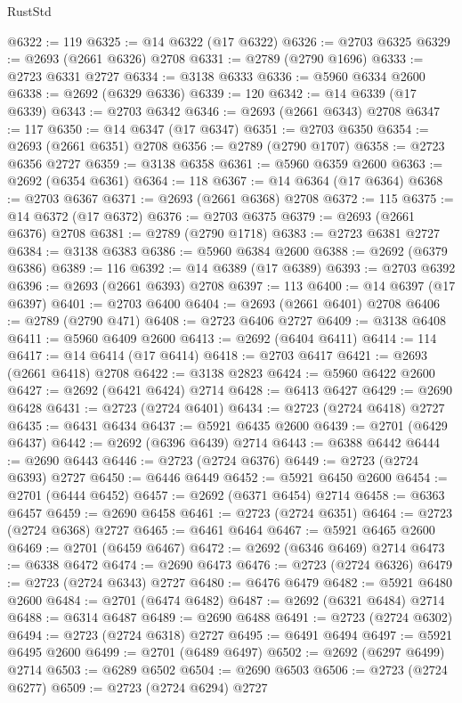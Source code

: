 \begin{lexlean}{RustStd}
\begin{coremodule}
@6322 := 119
@6325 := @14 @6322 (@17 @6322)
@6326 := @2703 @6325
@6329 := @2693 (@2661 @6326) @2708
@6331 := @2789 (@2790 @1696)
@6333 := @2723 @6331 @2727
@6334 := @3138 @6333
@6336 := @5960 @6334 @2600
@6338 := @2692 (@6329 @6336)
@6339 := 120
@6342 := @14 @6339 (@17 @6339)
@6343 := @2703 @6342
@6346 := @2693 (@2661 @6343) @2708
@6347 := 117
@6350 := @14 @6347 (@17 @6347)
@6351 := @2703 @6350
@6354 := @2693 (@2661 @6351) @2708
@6356 := @2789 (@2790 @1707)
@6358 := @2723 @6356 @2727
@6359 := @3138 @6358
@6361 := @5960 @6359 @2600
@6363 := @2692 (@6354 @6361)
@6364 := 118
@6367 := @14 @6364 (@17 @6364)
@6368 := @2703 @6367
@6371 := @2693 (@2661 @6368) @2708
@6372 := 115
@6375 := @14 @6372 (@17 @6372)
@6376 := @2703 @6375
@6379 := @2693 (@2661 @6376) @2708
@6381 := @2789 (@2790 @1718)
@6383 := @2723 @6381 @2727
@6384 := @3138 @6383
@6386 := @5960 @6384 @2600
@6388 := @2692 (@6379 @6386)
@6389 := 116
@6392 := @14 @6389 (@17 @6389)
@6393 := @2703 @6392
@6396 := @2693 (@2661 @6393) @2708
@6397 := 113
@6400 := @14 @6397 (@17 @6397)
@6401 := @2703 @6400
@6404 := @2693 (@2661 @6401) @2708
@6406 := @2789 (@2790 @471)
@6408 := @2723 @6406 @2727
@6409 := @3138 @6408
@6411 := @5960 @6409 @2600
@6413 := @2692 (@6404 @6411)
@6414 := 114
@6417 := @14 @6414 (@17 @6414)
@6418 := @2703 @6417
@6421 := @2693 (@2661 @6418) @2708
@6422 := @3138 @2823
@6424 := @5960 @6422 @2600
@6427 := @2692 (@6421 @6424) @2714
@6428 := @6413 @6427
@6429 := @2690 @6428
@6431 := @2723 (@2724 @6401)
@6434 := @2723 (@2724 @6418) @2727
@6435 := @6431 @6434
@6437 := @5921 @6435 @2600
@6439 := @2701 (@6429 @6437)
@6442 := @2692 (@6396 @6439) @2714
@6443 := @6388 @6442
@6444 := @2690 @6443
@6446 := @2723 (@2724 @6376)
@6449 := @2723 (@2724 @6393) @2727
@6450 := @6446 @6449
@6452 := @5921 @6450 @2600
@6454 := @2701 (@6444 @6452)
@6457 := @2692 (@6371 @6454) @2714
@6458 := @6363 @6457
@6459 := @2690 @6458
@6461 := @2723 (@2724 @6351)
@6464 := @2723 (@2724 @6368) @2727
@6465 := @6461 @6464
@6467 := @5921 @6465 @2600
@6469 := @2701 (@6459 @6467)
@6472 := @2692 (@6346 @6469) @2714
@6473 := @6338 @6472
@6474 := @2690 @6473
@6476 := @2723 (@2724 @6326)
@6479 := @2723 (@2724 @6343) @2727
@6480 := @6476 @6479
@6482 := @5921 @6480 @2600
@6484 := @2701 (@6474 @6482)
@6487 := @2692 (@6321 @6484) @2714
@6488 := @6314 @6487
@6489 := @2690 @6488
@6491 := @2723 (@2724 @6302)
@6494 := @2723 (@2724 @6318) @2727
@6495 := @6491 @6494
@6497 := @5921 @6495 @2600
@6499 := @2701 (@6489 @6497)
@6502 := @2692 (@6297 @6499) @2714
@6503 := @6289 @6502
@6504 := @2690 @6503
@6506 := @2723 (@2724 @6277)
@6509 := @2723 (@2724 @6294) @2727

\end{coremodule}
\end{lexlean}
